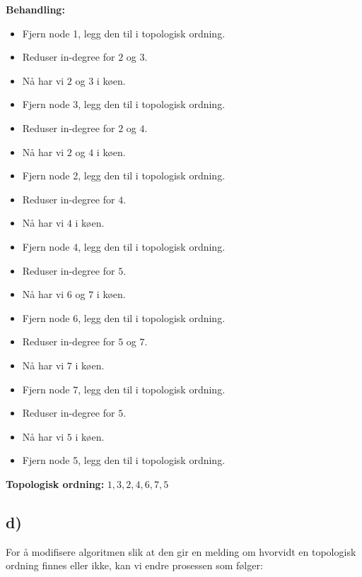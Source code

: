 \documentclass[12pt]{article}
\begin{document}
\textbf{Behandling:}
\begin{itemize}
    \item Fjern node 1, legg den til i topologisk ordning.
    \item Reduser in-degree for \(2\) og \(3\).
    \item Nå har vi \(2\) og \(3\) i køen.
    \item Fjern node 3, legg den til i topologisk ordning.
    \item Reduser in-degree for \(2\) og \(4\).
    \item Nå har vi \(2\) og \(4\) i køen.
    \item Fjern node 2, legg den til i topologisk ordning.
    \item Reduser in-degree for \(4\).
    \item Nå har vi \(4\) i køen.
    \item Fjern node 4, legg den til i topologisk ordning.
    \item Reduser in-degree for \(5\).
    \item Nå har vi \(6\) og \(7\) i køen.
    \item Fjern node 6, legg den til i topologisk ordning.
    \item Reduser in-degree for \(5\) og \(7\).
    \item Nå har vi \(7\) i køen.
    \item Fjern node 7, legg den til i topologisk ordning.
    \item Reduser in-degree for \(5\).
    \item Nå har vi \(5\) i køen.
    \item Fjern node 5, legg den til i topologisk ordning.
\end{itemize}

\noindent
\textbf{Topologisk ordning:} \(1, 3, 2, 4, 6, 7, 5\)

\subsection*{d)}

For å modifisere algoritmen slik at den gir en melding om hvorvidt en topologisk ordning finnes eller ikke, kan vi endre prosessen som følger:
\end{document}
